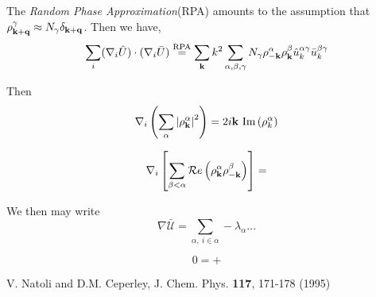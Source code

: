\documentclass{article}
\begin{document}
The {\em Random Phase Approximation}(RPA) amounts to the assumption
that $\rho^\gamma_{\mathbf{k} + \mathbf{q}} \approx N_\gamma \delta_{\mathbf{k} + \mathbf{q}}$. 
Then we have,
\begin{equation}
\sum_i (\nabla_i \hat{U}) \cdot ( \nabla_i \bar{U} ) \overset{\text{RPA}}{=}
\sum_{\mathbf{k}} k^2 \sum_{\alpha, \beta, \gamma} N_\gamma \rho^\alpha_{-\mathbf{k}}
\rho^\beta_{\mathbf{k}} \hat{u}^{\alpha \gamma}_k \bar{u}^{\beta \gamma}_k
\end{equation}

Then
\begin{equation}
\nabla_i \left(\sum_\alpha \left| \rho_{\mathbf{k}}^{\alpha}\right|^2\right) =
2i\mathbf{k} \ \text{Im}\left( \rho_k^\alpha\right)
\end{equation}

\begin{equation}
\nabla_i \left[ \sum_{\beta<\alpha}
\mathcal{R}e \left(\rho_{\mathbf{k}}^\alpha \rho_{-\mathbf{k}}^\beta \right)\right] = 
\end{equation}

We then may write
\begin{equation}
\nabla \bar{\mathcal{U}} = \sum_{\alpha, \ i\in\alpha} -\lambda_\alpha
...
\end{equation}




\begin{equation}
0 = +
\end{equation}




\begin{thebibliography}{9}
   V. Natoli and D.M. Ceperley, J. Chem. Phys. {\bf
  117}, 171-178 (1995)
\end{thebibliography}
\end{document}
